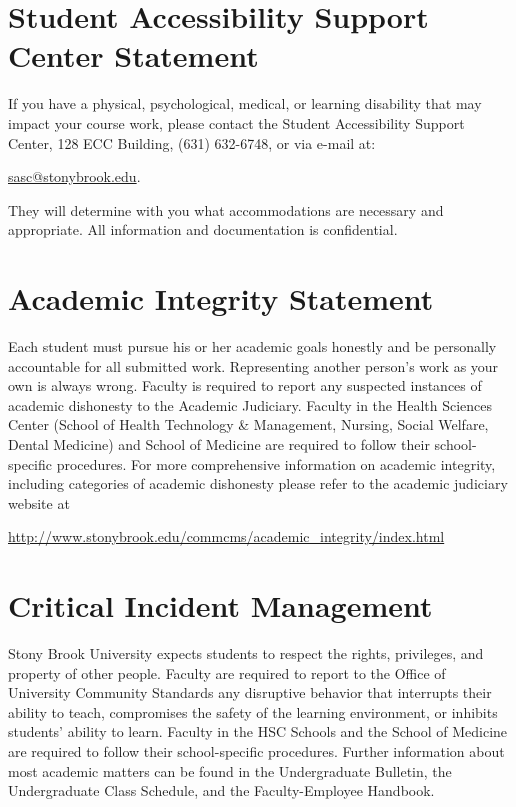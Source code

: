 \documentclass[11pt]{amsart}
\numberwithin{equation}{section}
\begin{document}
\section{Student Accessibility Support Center Statement}

If you have a physical, psychological, medical, or learning disability that may impact your course work, please contact the Student Accessibility Support Center, 128 ECC Building, (631) 632-6748, or via e-mail at: 
\begin{center}
\href{mailto: sasc@stonybrook.edu}{sasc@stonybrook.edu}.
\end{center} 
They will determine with you what accommodations are necessary and appropriate. All information and documentation is confidential.

\section{Academic Integrity Statement}

Each student must pursue his or her academic goals honestly and be personally accountable for all submitted work. Representing another person's work as your own is always wrong. Faculty is required to report any suspected instances of academic dishonesty to the Academic Judiciary. Faculty in the Health Sciences Center (School of Health Technology \& Management, Nursing, Social Welfare, Dental Medicine) and School of Medicine are required to follow their school-specific procedures. For more comprehensive information on academic integrity, including categories of academic dishonesty please refer to the academic judiciary website at
\begin{center}
\url{http://www.stonybrook.edu/commcms/academic_integrity/index.html}
\end{center}

\section{Critical Incident Management}

Stony Brook University expects students to respect the rights, privileges, and property of other people. Faculty are required to report to the Office of University Community Standards any disruptive behavior that interrupts their ability to teach, compromises the safety of the learning environment, or inhibits students' ability to learn. Faculty in the HSC Schools and the School of Medicine are required to follow their school-specific procedures. Further information about most academic matters can be found in the Undergraduate Bulletin, the Undergraduate Class Schedule, and the Faculty-Employee Handbook.
\end{document}
